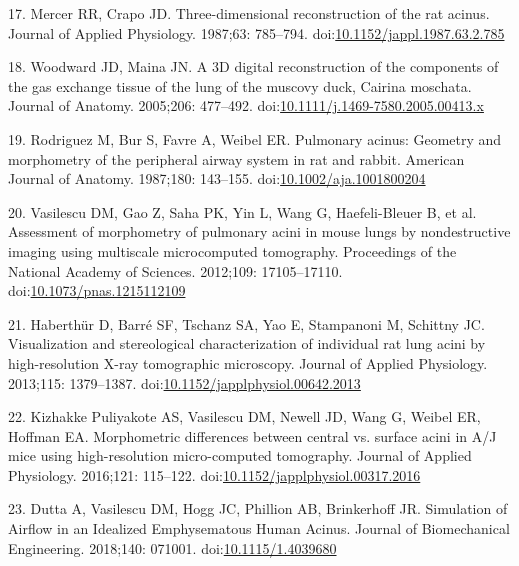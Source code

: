 \documentclass[
  american,
]{article}
\newenvironment{cslreferences}%
  {}%
  {\par}
\begin{document}
\begin{cslreferences}
\leavevmode\hypertarget{ref-c3aIB7f9}{}%
17. Mercer RR, Crapo JD. Three-dimensional reconstruction of the rat acinus. Journal of Applied Physiology. 1987;63: 785--794. doi:\href{https://doi.org/10.1152/jappl.1987.63.2.785}{10.1152/jappl.1987.63.2.785}

\leavevmode\hypertarget{ref-CPhMy3Ie}{}%
18. Woodward JD, Maina JN. A 3D digital reconstruction of the components of the gas exchange tissue of the lung of the muscovy duck, Cairina moschata. Journal of Anatomy. 2005;206: 477--492. doi:\href{https://doi.org/10.1111/j.1469-7580.2005.00413.x}{10.1111/j.1469-7580.2005.00413.x}

\leavevmode\hypertarget{ref-1GJECnKBu}{}%
19. Rodriguez M, Bur S, Favre A, Weibel ER. Pulmonary acinus: Geometry and morphometry of the peripheral airway system in rat and rabbit. American Journal of Anatomy. 1987;180: 143--155. doi:\href{https://doi.org/10.1002/aja.1001800204}{10.1002/aja.1001800204}

\leavevmode\hypertarget{ref-C6OaY84D}{}%
20. Vasilescu DM, Gao Z, Saha PK, Yin L, Wang G, Haefeli-Bleuer B, et al. Assessment of morphometry of pulmonary acini in mouse lungs by nondestructive imaging using multiscale microcomputed tomography. Proceedings of the National Academy of Sciences. 2012;109: 17105--17110. doi:\href{https://doi.org/10.1073/pnas.1215112109}{10.1073/pnas.1215112109}

\leavevmode\hypertarget{ref-7YLeeyu}{}%
21. Haberthür D, Barré SF, Tschanz SA, Yao E, Stampanoni M, Schittny JC. Visualization and stereological characterization of individual rat lung acini by high-resolution X-ray tomographic microscopy. Journal of Applied Physiology. 2013;115: 1379--1387. doi:\href{https://doi.org/10.1152/japplphysiol.00642.2013}{10.1152/japplphysiol.00642.2013}

\leavevmode\hypertarget{ref-RGBeCf8v}{}%
22. Kizhakke Puliyakote AS, Vasilescu DM, Newell JD, Wang G, Weibel ER, Hoffman EA. Morphometric differences between central vs. surface acini in A/J mice using high-resolution micro-computed tomography. Journal of Applied Physiology. 2016;121: 115--122. doi:\href{https://doi.org/10.1152/japplphysiol.00317.2016}{10.1152/japplphysiol.00317.2016}

\leavevmode\hypertarget{ref-NPtttMC0}{}%
23. Dutta A, Vasilescu DM, Hogg JC, Phillion AB, Brinkerhoff JR. Simulation of Airflow in an Idealized Emphysematous Human Acinus. Journal of Biomechanical Engineering. 2018;140: 071001. doi:\href{https://doi.org/10.1115/1.4039680}{10.1115/1.4039680}


\end{cslreferences}
\end{document}
